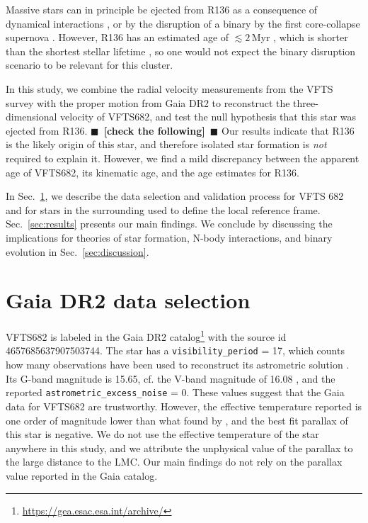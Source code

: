 \documentclass{aa}
\newcommand{\todo}[1]{{\large $\blacksquare$~\textbf{\color{red}[#1]}}~$\blacksquare$}
\DeclareRobustCommand{\Secref}[1]{Sec.~\ref{#1}}
\begin{document}
Massive stars can in principle be ejected from R136 as a consequence of dynamical
interactions \citep[][]{poveda:67,leonard:91, evans:10, fujii:11,
  allison:12, oh:16}, or by the disruption of a binary by the first
core-collapse supernova
\citep[][]{zwicky:57,blaauw:61,dedonder:97,eldridge:11,renzo:18}. However,
R136 has an estimated age of $\lesssim2$\,Myr \citep[][]{sabbi:12}, which is
shorter than the shortest stellar lifetime
\citep[$\sim$3\,Myr, e.g.,][]{zapartas:17}, so one would not expect the binary
disruption scenario to be relevant for this cluster.


In this study, we combine the radial velocity measurements from the
VFTS survey \citep[][]{evans:11} with the proper motion from Gaia DR2
to reconstruct the three-dimensional velocity of VFTS682, and test the
null hypothesis that this star was ejected from R136. \todo{check the
  following} Our results indicate that R136 is the likely origin of
this star, and therefore isolated star formation is \emph{not}
required to explain it. However, we find a mild discrepancy between the
apparent age of VFTS682, its kinematic age, and the age estimates for
R136. 

In \Secref{sec:sample}, we describe the data selection and validation
process for VFTS 682 and for stars in the surrounding used to
define the local reference frame. \Secref{sec:results} presents our main findings. We conclude
by discussing the implications for theories of
star formation, N-body interactions, and binary evolution in
\Secref{sec:discussion}.

\section{Gaia DR2 data selection}
\label{sec:sample}

VFTS682 is labeled in the Gaia DR2
catalog\footnote{\url{https://gea.esac.esa.int/archive/}} with the
source id 4657685637907503744. The star has a
\texttt{visibility\_period} = 17, which counts how many observations have
been used to reconstruct its astrometric solution \citep[][]{lindengren:18}. Its G-band
magnitude is 15.65, cf. the V-band magnitude of 16.08
\citep[][]{evans:11, bestenlehner:11}, and the reported
\texttt{astrometric\_excess\_noise} = 0. These values suggest that the Gaia
data for VFTS682 are trustworthy. However, the effective temperature
reported is one order of magnitude lower than what found by
\cite{bestenlehner:11}, and the best fit parallax of this star is
negative. We do not use the effective temperature of the star anywhere
in this study, and we attribute the unphysical value of the parallax
to the large distance to the LMC. Our main findings do not rely on the
parallax value reported in the Gaia catalog.
\end{document}
